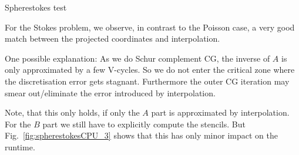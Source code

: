 \documentclass[a4paper,11pt,reqno]{amsart}
\numberwithin{figure}{section}
\numberwithin{table}{section}
\numberwithin{figure}{section}
\begin{document}
\begin{section}{Spherestokes test}


For the Stokes problem, we observe, in contrast to the Poisson case,
a very good match between the projected coordinates and interpolation.

One possible explanation:
As we do Schur complement CG, the inverse of $A$ is only 
approximated by a few V-cycles. So we do not enter the 
critical zone where the discretisation error
gets stagnant. Furthermore the outer CG iteration may 
smear out/eliminate the error introduced by interpolation.

Note, that this only holds, if only the $A$ part is approximated by
interpolation. For the $B$ part we still have to explicitly compute the
stencils. But Fig.~\ref{fig:spherestokesCPU_3} shows that this has only
minor impact on the runtime.




\end{section}
\end{document}
